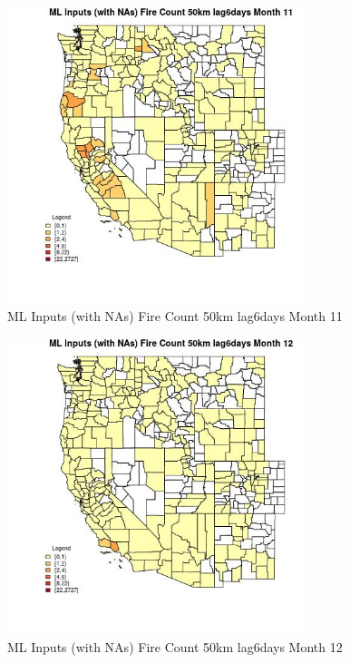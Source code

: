 \clearpage 

\begin{figure} 
\centering  
\includegraphics[width=0.77\textwidth]{Code_Outputs/Report_ML_input_PM25_Step4_part_f_de_duplicated_aves_prioritize_24hr_obswNAs_CountyFire_Count_50km_lag6daysmedianMonth11.jpg} 
\caption{\label{fig:Report_ML_input_PM25_Step4_part_f_de_duplicated_aves_prioritize_24hr_obswNAsCountyFire_Count_50km_lag6daysmedianMonth11}ML Inputs (with NAs) Fire Count 50km lag6days Month 11} 
\end{figure} 
 

\begin{figure} 
\centering  
\includegraphics[width=0.77\textwidth]{Code_Outputs/Report_ML_input_PM25_Step4_part_f_de_duplicated_aves_prioritize_24hr_obswNAs_CountyFire_Count_50km_lag6daysmedianMonth12.jpg} 
\caption{\label{fig:Report_ML_input_PM25_Step4_part_f_de_duplicated_aves_prioritize_24hr_obswNAsCountyFire_Count_50km_lag6daysmedianMonth12}ML Inputs (with NAs) Fire Count 50km lag6days Month 12} 
\end{figure} 
 


